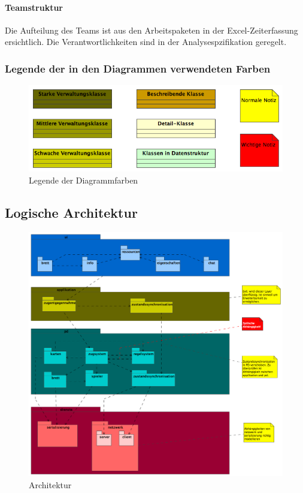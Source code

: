 \documentclass[a4paper,12pt,halfparskip,DIV14]{scrartcl}
\begin{document}
\paragraph{Teamstruktur}\label{ssub:teamstruktur} %
Die Aufteilung des Teams ist aus den Arbeitspaketen in der Excel-Zeiterfassung ersichtlich. Die Verantwortlichkeiten sind in der Analysespzifikation geregelt.
\newpage
\subsubsection{Legende der in den Diagrammen verwendeten Farben}\label{ssub:legende} %
\begin{figure}
	[htp] \centering 
	\includegraphics[width=1\textwidth]{legende.png} \caption{Legende der Diagrammfarben}\label{fig:legende.png} 
\end{figure}

\newpage
\subsection{Logische Architektur} %
\label{sub:logische_architektur}
\begin{figure}
	[htp] \centering 
	\includegraphics[width=1\textwidth]{Architektur.png} \caption{Architektur}\label{fig:Architektur.png} 
\end{figure}
\end{document}
